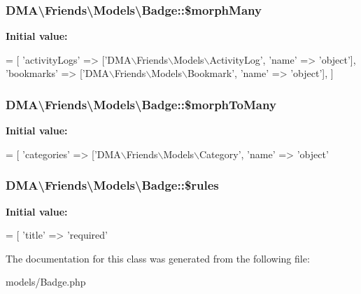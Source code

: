 \subsubsection[{\$morph\+Many}]{\setlength{\rightskip}{0pt plus 5cm}D\+M\+A\textbackslash{}\+Friends\textbackslash{}\+Models\textbackslash{}\+Badge\+::\$morph\+Many}\label{classDMA_1_1Friends_1_1Models_1_1Badge_a239fed984baad287f15badaaece428ff}
{\bfseries Initial value\+:}
\begin{DoxyCode}
= [
        \textcolor{stringliteral}{'activityLogs'}  => [\textcolor{stringliteral}{'DMA\(\backslash\)Friends\(\backslash\)Models\(\backslash\)ActivityLog'}, \textcolor{stringliteral}{'name'} => \textcolor{stringliteral}{'object'}],
        \textcolor{stringliteral}{'bookmarks'}     => [\textcolor{stringliteral}{'DMA\(\backslash\)Friends\(\backslash\)Models\(\backslash\)Bookmark'}, \textcolor{stringliteral}{'name'} => \textcolor{stringliteral}{'object'}],
    ]
\end{DoxyCode}
\hypertarget{classDMA_1_1Friends_1_1Models_1_1Badge_a2efb4ca933422dfb4ca416676d73cad0}{}
\subsubsection[{\$morph\+To\+Many}]{\setlength{\rightskip}{0pt plus 5cm}D\+M\+A\textbackslash{}\+Friends\textbackslash{}\+Models\textbackslash{}\+Badge\+::\$morph\+To\+Many}\label{classDMA_1_1Friends_1_1Models_1_1Badge_a2efb4ca933422dfb4ca416676d73cad0}
{\bfseries Initial value\+:}
\begin{DoxyCode}
= [
        \textcolor{stringliteral}{'categories'}    => [\textcolor{stringliteral}{'DMA\(\backslash\)Friends\(\backslash\)Models\(\backslash\)Category'}, \textcolor{stringliteral}{'name'} => \textcolor{stringliteral}{'object'}
\end{DoxyCode}
\hypertarget{classDMA_1_1Friends_1_1Models_1_1Badge_ab750ee2c75af273ca930a12b1a20b3ae}{}
\subsubsection[{\$rules}]{\setlength{\rightskip}{0pt plus 5cm}D\+M\+A\textbackslash{}\+Friends\textbackslash{}\+Models\textbackslash{}\+Badge\+::\$rules}\label{classDMA_1_1Friends_1_1Models_1_1Badge_ab750ee2c75af273ca930a12b1a20b3ae}
{\bfseries Initial value\+:}
\begin{DoxyCode}
= [ 
        \textcolor{stringliteral}{'title'} => \textcolor{stringliteral}{'required'}
\end{DoxyCode}


The documentation for this class was generated from the following file\+:\begin{DoxyCompactItemize}
\item 
models/Badge.\+php\end{DoxyCompactItemize}
